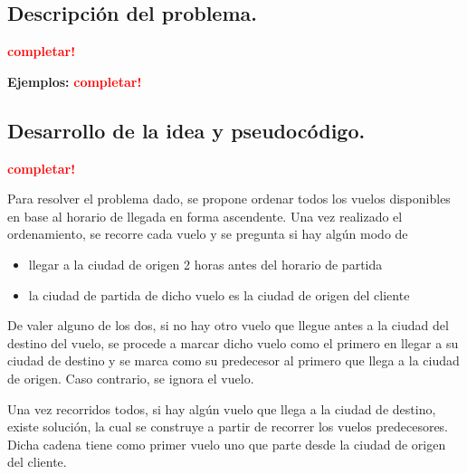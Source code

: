 \subsection{Descripción del problema.}

\vspace*{0.3cm}

\textcolor{red}{\textbf{completar!}}

\vspace*{0.5cm}

\textbf{Ejemplos:}
  \textcolor{red}{\textbf{completar!}}



\newpage
\subsection{Desarrollo de la idea y pseudocódigo.}

\vspace*{0.3cm}

\textcolor{red}{\textbf{completar!}}


Para resolver el problema dado, se propone ordenar todos los vuelos disponibles
en base al horario de llegada en forma ascendente. Una vez realizado el ordenamiento,
se recorre cada vuelo y se pregunta si hay algún modo de
\begin{itemize}
  \item llegar a la ciudad de origen 2 horas antes del horario de partida
  \item la ciudad de partida de dicho vuelo es la ciudad de origen del cliente
\end{itemize}
De valer alguno de los dos, si no hay otro vuelo que llegue antes a la ciudad del
destino del vuelo, se procede a marcar dicho vuelo como el primero en llegar a su
ciudad de destino y se marca como su predecesor al primero que llega a la ciudad
de origen. Caso contrario, se ignora el vuelo.

Una vez recorridos todos, si hay algún vuelo que llega a la ciudad de destino,
existe solución, la cual se construye a partir de recorrer los vuelos predecesores.
Dicha cadena tiene como primer vuelo uno que parte desde la ciudad de origen del
cliente.


